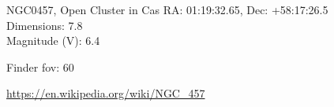 \begin{block}{NGC0457, Open Cluster in Cas}
    RA: 01:19:32.65, Dec: +58:17:26.5 \\ 
    Dimensions: 7.8 \\ 
    Magnitude (V): 6.4



    Finder fov: 60 

    \url{https://en.wikipedia.org/wiki/NGC_457} 
\end{block}